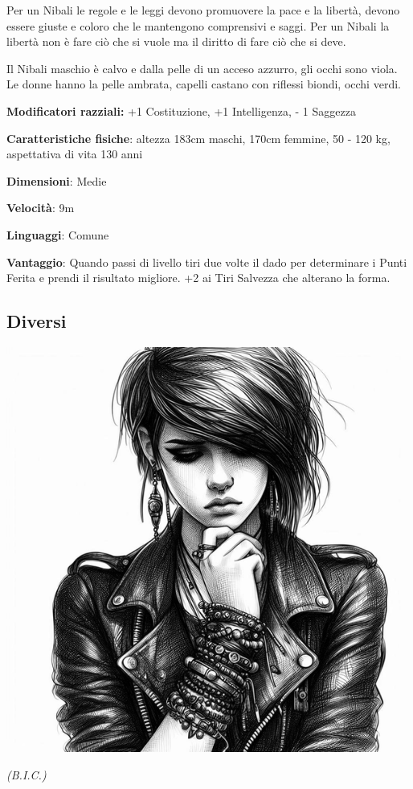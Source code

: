 \begin{multicols}{2}
Per un Nibali le regole e le leggi devono promuovere la pace e la libertà, devono essere giuste e coloro che le mantengono comprensivi e saggi. Per un Nibali la libertà non è fare ciò che si vuole ma il diritto di fare ciò che si deve.

Il Nibali maschio è calvo e dalla pelle di un acceso azzurro, gli occhi sono viola. Le donne hanno la pelle ambrata, capelli castano con riflessi biondi, occhi verdi.

\textbf{Modificatori razziali:} +1 Costituzione, +1 Intelligenza, - 1 Saggezza

\textbf{Caratteristiche fisiche}: altezza 183cm maschi, 170cm femmine, 50 - 120 kg, aspettativa di vita 130 anni

\textbf{Dimensioni}: Medie

\textbf{Velocità}: 9m

\textbf{Linguaggi}: Comune

\textbf{Vantaggio}: Quando passi di livello tiri due volte il dado per determinare i Punti Ferita e prendi il risultato migliore. +2 ai Tiri Salvezza che alterano la forma.

\subsection{Diversi}\label{diverso}\hypertarget{diverso}{}

\begin{center}
\includegraphics[width=0.7\linewidth]{immagini/diverso2-ai.png}

\emph{(B.I.C.)}
\end{center}


\end{multicols}
